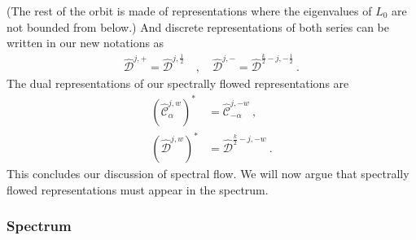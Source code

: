 \documentclass[12pt, a4paper, notitlepage, twoside]{report}
\numberwithin{equation}{section}
\theoremstyle{break}
\begin{document}
(The rest of the orbit is made of representations where the eigenvalues of $L_0$ are not bounded from below.)
And discrete representations of both series can be written in our new notations as 
\begin{align}
 \hat{\mathcal{D}}^{j,+} = \hat{\mathcal{D}}^{j,\frac12} \quad , \quad \hat{\mathcal{D}}^{j,-} = \hat{\mathcal{D}}^{\frac{k}{2}-j,-\frac12}\ .
 \label{dpdo}
\end{align}
The dual representations of our spectrally flowed representations are
\begin{align}
 (\hat{\mathcal{C}}^{j,w}_{\alpha})^* &= \hat{\mathcal{C}}^{j,-w}_{-\alpha}\ ,
\label{cjwd}
\\
(\hat{\mathcal{D}}^{j,w})^* &= \hat{\mathcal{D}}^{\frac{k}{2}-j,-w}\ .
\label{djwd}
\end{align}
This concludes our discussion of spectral flow.
We will now argue that spectrally flowed representations must appear in the spectrum. 

\subsubsection{Spectrum}
\end{document}
